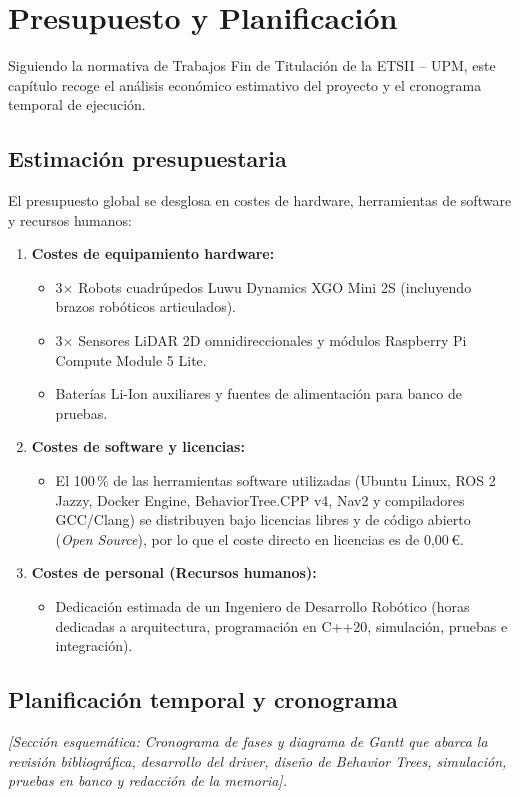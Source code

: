 \chapter{Presupuesto y Planificación}
\label{chap:presupuesto}

Siguiendo la normativa de Trabajos Fin de Titulación de la ETSII -- UPM, este capítulo recoge el análisis económico estimativo del proyecto y el cronograma temporal de ejecución.

\section{Estimación presupuestaria}
\label{sec:presupuesto_costes}

El presupuesto global se desglosa en costes de hardware, herramientas de software y recursos humanos:

\begin{enumerate}
    \item \textbf{Costes de equipamiento hardware:}
    \begin{itemize}
        \item 3$\times$ Robots cuadrúpedos Luwu Dynamics XGO Mini 2S (incluyendo brazos robóticos articulados).
        \item 3$\times$ Sensores LiDAR 2D omnidireccionales y módulos Raspberry Pi Compute Module 5 Lite.
        \item Baterías Li-Ion auxiliares y fuentes de alimentación para banco de pruebas.
    \end{itemize}
    \item \textbf{Costes de software y licencias:}
    \begin{itemize}
        \item El 100\,\% de las herramientas software utilizadas (Ubuntu Linux, ROS 2 Jazzy, Docker Engine, BehaviorTree.CPP v4, Nav2 y compiladores GCC/Clang) se distribuyen bajo licencias libres y de código abierto (\textit{Open Source}), por lo que el coste directo en licencias es de 0,00\,\euro.
    \end{itemize}
    \item \textbf{Costes de personal (Recursos humanos):}
    \begin{itemize}
        \item Dedicación estimada de un Ingeniero de Desarrollo Robótico (horas dedicadas a arquitectura, programación en C++20, simulación, pruebas e integración).
    \end{itemize}
\end{enumerate}

\section{Planificación temporal y cronograma}
\label{sec:cronograma}

\textit{[Sección esquemática: Cronograma de fases y diagrama de Gantt que abarca la revisión bibliográfica, desarrollo del driver, diseño de Behavior Trees, simulación, pruebas en banco y redacción de la memoria].}
